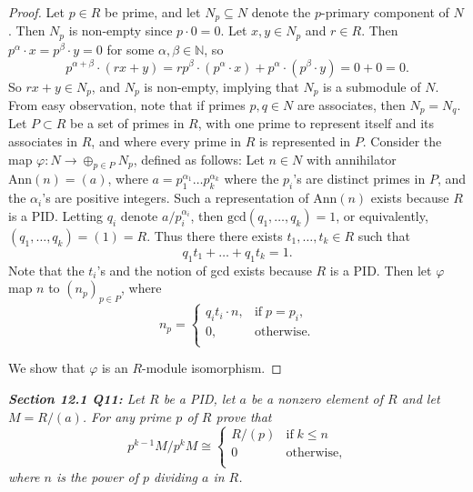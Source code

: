 \documentclass{article}
\begin{document}
  \begin{proof}
    Let $p\in R$ be prime, and let $N_p\subseteq N$ denote the $p$-primary
    component of $N$. Then $N_p$ is non-empty since $p\cdot0=0$. Let
    $x,y\in N_p$ and $r\in R$. Then $p^\alpha\cdot x=p^\beta\cdot y=0$ for
    some $\alpha,\beta\in\mathbb{N}$, so
    \[p^{\alpha+\beta}\cdot(rx+y) =rp^\beta\cdot(p^\alpha\cdot
    x)+p^\alpha\cdot(p^\beta\cdot y) =0+0=0.\]
    So $rx+y\in N_p$, and $N_p$ is non-empty, implying that $N_p$ is a
    submodule of $N$. \\

    From easy observation, note that if primes $p,q\in N$ are associates,
    then $N_p=N_q$. Let $P\subset R$ be a set of primes in $R$, with one
    prime to represent itself and its associates in $R$, and where every
    prime in $R$ is represented in $P$. Consider the map
    $\varphi:N\rightarrow \oplus_{p\in P}N_p$, defined as follows: Let
    $n\in N$ with annihilator $\text{Ann}(n)=(a)$, where
    $a=p_1^{\alpha_1}\ldots p_k^{\alpha_k}$ where the $p_i$'s are distinct
    primes in $P$, and the $\alpha_i$'s are positive integers. Such a
    representation of $\text{Ann}(n)$ exists because $R$ is a PID. Letting
    $q_i$ denote $a/p_i^{\alpha_i}$, then $\text{gcd}(q_1,\ldots,q_k)=1$,
    or equivalently, $(q_1,\ldots,q_k)=(1)=R$. Thus there there exists
    $t_1,\ldots,t_k\in R$ such that \[q_1t_1+\ldots+q_1t_k=1.\] Note that
    the $t_i$'s and the notion of gcd exists because $R$ is a PID. Then let
    $\varphi$ map $n$ to $(n_p)_{p\in P}$, where
    \begin{equation*}
      n_p=
      \begin{cases}
        q_it_i\cdot n, &\text{if}\; p=p_i,\\
        0, &\text{otherwise}. \\
      \end{cases}
    \end{equation*}

    We show that $\varphi$ is an $R$-module isomorphism.
  \end{proof}

\it \textbf{Section 12.1 Q11:} Let $R$ be a PID, let $a$ be a nonzero
  element of $R$ and let $M=R/(a)$. For any prime $p$ of $R$ prove that
  \begin{equation*}
    p^{k-1}M/p^kM\cong
    \begin{cases}
      R/(p) &\text{if}\; k\leq n\\
      0 &\text{otherwise},\\
    \end{cases}
  \end{equation*}
  where $n$ is the power of $p$ dividing $a$ in $R$.
\end{document}
